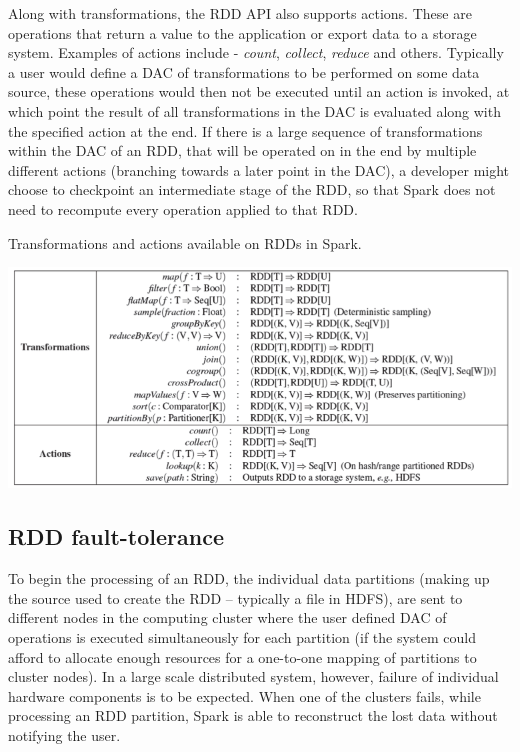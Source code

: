 \documentclass{l4proj}
\begin{document}
Along with transformations, the RDD API also supports actions. These are operations that return a value to the application or export data to a storage system. Examples of actions include - \textit{count}, \textit{collect}, \textit{reduce} and others. Typically a user would define a DAC of transformations to be performed on some data source, these operations would then not be executed until an action is invoked, at which point the result of all transformations in the DAC is evaluated along with the specified action at the end. If there is a large sequence of transformations within the DAC of an RDD, that will be operated on in the end by multiple different actions (branching towards a later point in the DAC), a developer might choose to checkpoint an intermediate stage of the RDD, so that Spark does not need to recompute every operation applied to that RDD.

\begin{table}[H]
\label{Actions and Transformations}
\caption{Transformations and actions available on RDDs in Spark.}
\includegraphics[width=1.0\textwidth]{images/spark-trans-action-edited}
\end{table}

\subsection{RDD fault-tolerance}

To begin the processing of an RDD, the individual data partitions (making up the source used to create the RDD -- typically a file in HDFS), are sent to different nodes in the computing cluster where the user defined DAC of operations is executed simultaneously for each partition (if the system could afford to allocate enough resources for a one-to-one mapping of partitions to cluster nodes). In a large scale distributed system, however, failure of individual hardware components is to be expected. When one of the clusters fails, while processing an RDD partition, Spark is able to reconstruct the lost data without notifying the user.
\end{document}
